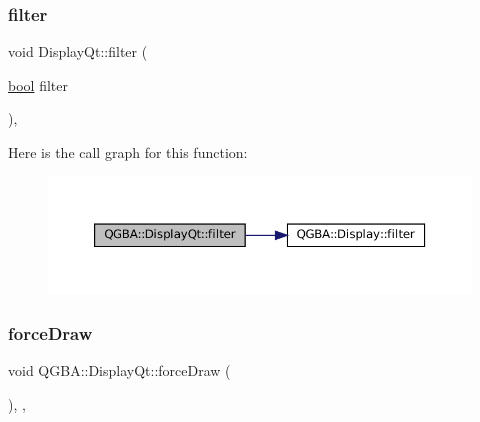 \subsubsection{\texorpdfstring{filter}{filter}}
{\footnotesize\ttfamily void Display\+Qt\+::filter (\begin{DoxyParamCaption}\item[{\mbox{\hyperlink{libretro_8h_a4a26dcae73fb7e1528214a068aca317e}{bool}}}]{filter }\end{DoxyParamCaption})\hspace{0.3cm}{\ttfamily [override]}, {\ttfamily [slot]}}

Here is the call graph for this function\+:
\nopagebreak
\begin{figure}[H]
\begin{center}
\leavevmode
\includegraphics[width=350pt]{class_q_g_b_a_1_1_display_qt_a0360fcb35c09f0c48b22f9462d26cab0_cgraph}
\end{center}
\end{figure}
\mbox{\label{class_q_g_b_a_1_1_display_qt_a3d2e6ebd22d799f9d92f9b53d19072a7}} 
\subsubsection{\texorpdfstring{force\+Draw}{forceDraw}}
{\footnotesize\ttfamily void Q\+G\+B\+A\+::\+Display\+Qt\+::force\+Draw (\begin{DoxyParamCaption}{ }\end{DoxyParamCaption})\hspace{0.3cm}{\ttfamily [inline]}, {\ttfamily [override]}, {\ttfamily [slot]}}

\mbox{\label{class_q_g_b_a_1_1_display_qt_a49d1bedef7318112a9c7a0ab33be314e}} 
